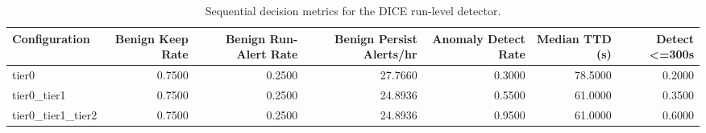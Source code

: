 \begin{table}[t]
\centering
\caption{Sequential decision metrics for the DICE run-level detector.}
\label{tab:dice_sequential_metrics}
\footnotesize
\begin{tabular}{lrrrrrr}
\toprule
Configuration & Benign Keep Rate & Benign Run-Alert Rate & Benign Persist Alerts/hr & Anomaly Detect Rate & Median TTD (s) & Detect <=300s \\
\midrule
tier0 & 0.7500 & 0.2500 & 27.7660 & 0.3000 & 78.5000 & 0.2000 \\
tier0_tier1 & 0.7500 & 0.2500 & 24.8936 & 0.5500 & 61.0000 & 0.3500 \\
tier0_tier1_tier2 & 0.7500 & 0.2500 & 24.8936 & 0.9500 & 61.0000 & 0.6000 \\
\bottomrule
\end{tabular}

\end{table}
